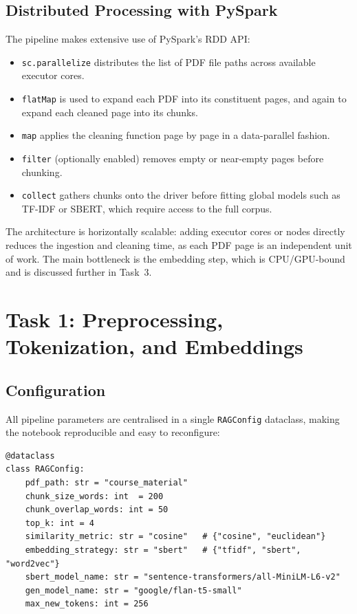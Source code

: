 \documentclass[a4paper,11pt]{article}
\begin{document}
\subsection{Distributed Processing with PySpark}

The pipeline makes extensive use of PySpark's RDD API:
\begin{itemize}[noitemsep]
  \item \texttt{sc.parallelize} distributes the list of PDF file paths across
        available executor cores.
  \item \texttt{flatMap} is used to expand each PDF into its constituent pages,
        and again to expand each cleaned page into its chunks.
  \item \texttt{map} applies the cleaning function page by page in a
        data-parallel fashion.
  \item \texttt{filter} (optionally enabled) removes empty or near-empty
        pages before chunking.
  \item \texttt{collect} gathers chunks onto the driver before fitting
        global models such as TF-IDF or SBERT, which require access to the
        full corpus.
\end{itemize}

The architecture is horizontally scalable: adding executor cores or nodes
directly reduces the ingestion and cleaning time, as each PDF page is an
independent unit of work. The main bottleneck is the embedding step, which
is CPU/GPU-bound and is discussed further in Task~3.

\section{Task 1: Preprocessing, Tokenization, and Embeddings}

\subsection{Configuration}

All pipeline parameters are centralised in a single \texttt{RAGConfig}
dataclass, making the notebook reproducible and easy to reconfigure:

\begin{lstlisting}
@dataclass
class RAGConfig:
    pdf_path: str = "course_material"
    chunk_size_words: int  = 200
    chunk_overlap_words: int = 50
    top_k: int = 4
    similarity_metric: str = "cosine"   # {"cosine", "euclidean"}
    embedding_strategy: str = "sbert"   # {"tfidf", "sbert", "word2vec"}
    sbert_model_name: str = "sentence-transformers/all-MiniLM-L6-v2"
    gen_model_name: str = "google/flan-t5-small"
    max_new_tokens: int = 256
\end{lstlisting}
\end{document}

